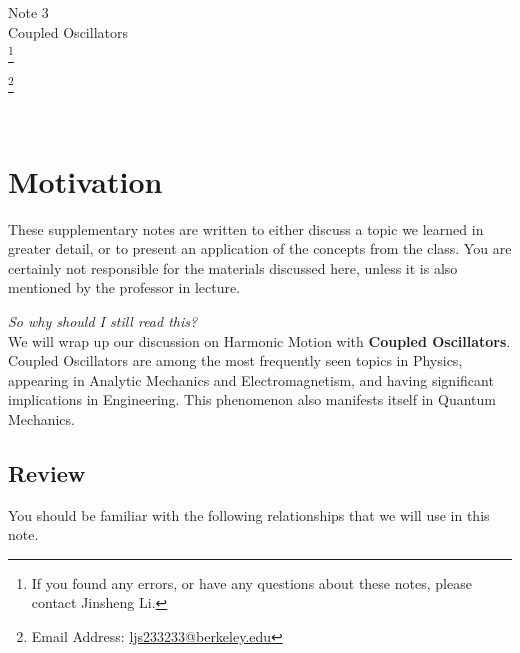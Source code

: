 \documentclass[11pt]{article}
\newcommand\blfootnote[1]{
    \begingroup
    \renewcommand\thefootnote{}\footnote{#1}
    \addtocounter{footnote}{-1}
    \endgroup
}
\theoremstyle{gangnamstyle}{\newtheorem{definition}{Definition}[]}
\theoremstyle{gangnamstyle}{\newtheorem{example}{Example}[]}
\theoremstyle{gangnamstyle}{\newtheorem{problem}{Problem}[]}
\theoremstyle{gangnamstyle}{\newtheorem{warning}{Warning}[]}
\begin{document}
\normalfont
\pagestyle{pages}


\begin{center}
\vspace{3in}
{\Large Note 3} \\[0.05in]
Coupled Oscillators  \\ 
\blfootnote{If you found any errors, or have any questions about these notes, please contact Jinsheng Li.} \blfootnote{Email Address: \href{mailto:ljs233233@berkeley.edu}{ljs233233@berkeley.edu}} \\ [-0.5in]
\end{center}

\section*{Motivation}

These supplementary notes are written to either discuss a topic we learned in greater detail, or to present an application of the concepts from the class. You are certainly not responsible for the materials discussed here, unless it is also mentioned by the professor in lecture. 

\textit{So why should I still read this?} \\
We will wrap up our discussion on Harmonic Motion with \textbf{Coupled Oscillators}. Coupled Oscillators are among the most frequently seen topics in Physics, appearing in Analytic Mechanics and Electromagnetism, and having significant implications in Engineering. This phenomenon also manifests itself in Quantum Mechanics. 

\subsection*{Review}

You should be familiar with the following relationships that we will use in this note. 
\end{document}
